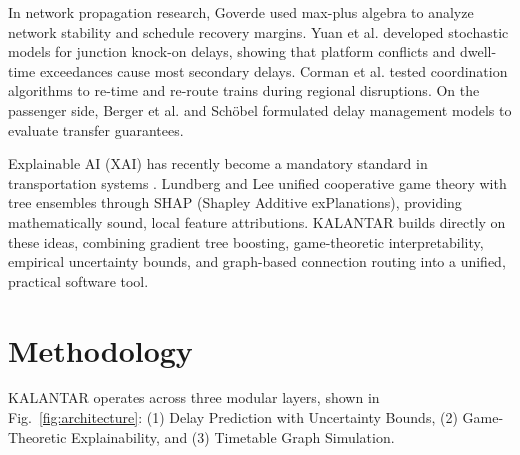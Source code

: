 \documentclass[11pt,a4paper]{article}
\begin{document}
In network propagation research, Goverde \cite{goverde2005p} used max-plus algebra to analyze network stability and schedule recovery margins. Yuan et al. \cite{yuan2008stochastic} developed stochastic models for junction knock-on delays, showing that platform conflicts and dwell-time exceedances cause most secondary delays. Corman et al. \cite{corman2010microscopic, corman2012real} tested coordination algorithms to re-time and re-route trains during regional disruptions. On the passenger side, Berger et al. \cite{berger2011stochastic} and Sch{\"o}bel \cite{schobel2007integer} formulated delay management models to evaluate transfer guarantees.

Explainable AI (XAI) has recently become a mandatory standard in transportation systems \cite{barredo2020explainable, muller2021explainability}. Lundberg and Lee \cite{lundberg2017unified, lundberg2020local} unified cooperative game theory with tree ensembles through SHAP (Shapley Additive exPlanations), providing mathematically sound, local feature attributions. KALANTAR builds directly on these ideas, combining gradient tree boosting, game-theoretic interpretability, empirical uncertainty bounds, and graph-based connection routing into a unified, practical software tool.

\section{Methodology}

KALANTAR operates across three modular layers, shown in Fig.~\ref{fig:architecture}: (1) Delay Prediction with Uncertainty Bounds, (2) Game-Theoretic Explainability, and (3) Timetable Graph Simulation.
\end{document}
